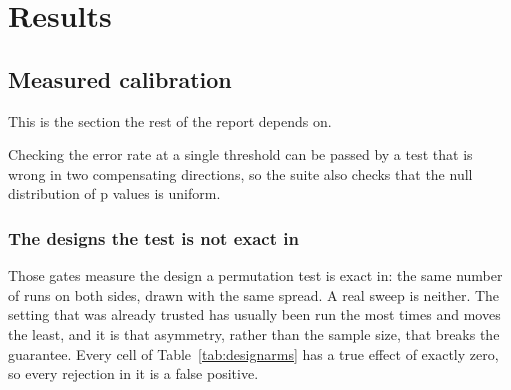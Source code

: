 \documentclass[11pt,a4paper]{report}
\begin{document}
\chapter{Results}
\label{ch:results}

\section{Measured calibration}
\label{sec:calibration}

This is the section the rest of the report depends on.

\begin{table}[htbp]
\centering
\small

\caption{Measured error rates against the phase gates. Every case is driven from
a fixed seed, so these numbers are deterministic and reproduced by
\texttt{make test-stats}, \factcalibrationcomparisons{} comparisons in
\factcalibrationseconds{}.}
\label{tab:calibration}
\end{table}

Checking the error rate at a single threshold can be passed by a test that is
wrong in two compensating directions, so the suite also checks that the null
distribution of p values is uniform.

\begin{table}[htbp]
\centering
\small

\caption{Rejection rates under the null at four thresholds. A calibrated test is
right everywhere, not only at 0.05.}
\label{tab:uniformity}
\end{table}

\subsection{The designs the test is not exact in}

Those gates measure the design a permutation test is exact in: the same number of
runs on both sides, drawn with the same spread. A real sweep is neither. The
setting that was already trusted has usually been run the most times and moves
the least, and it is that asymmetry, rather than the sample size, that breaks the
guarantee. Every cell of Table~\ref{tab:designarms} has a true effect of exactly
zero, so every rejection in it is a false positive.

\begin{table}[htbp]
\centering
\small

\caption{Type I error at a nominal 5 on designs that break plain
exchangeability. The quantity permuted is the Welch $t$, which is what holds the
first five rows near nominal; the sixth is conservative because macro F1 over
forty units is discrete; the seventh is what ignoring a known clustering costs.}
\label{tab:designarms}
\end{table}
\end{document}

